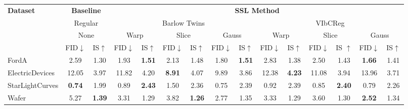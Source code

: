 \documentclass[../../thesis.tex]{subfiles}
\begin{document}
\begin{table}[H]
    \centering
    \begin{adjustbox}{width=\textwidth}
     \begin{tabular}{lcc|cc|cc|cc|cc|cc|cc} %
        \toprule
        \multirow{4}{*}{\textbf{Dataset}} & \multicolumn{2}{c}{\textbf{Baseline}} & \multicolumn{12}{c}{\textbf{SSL Method}} \\
                                            \cmidrule(lr){2-3} \cmidrule(lr){4-15}
                                          & \multicolumn{2}{c}{Regular}           & \multicolumn{6}{c}{Barlow Twins}                                                 &  \multicolumn{6}{c}{VIbCReg} \\
                                          \cmidrule(lr){2-3} \cmidrule(lr){4-9} \cmidrule(lr){10-15}
                                          &   \multicolumn{2}{c}{None}            & \multicolumn{2}{c}{Warp}  & \multicolumn{2}{c}{Slice} & \multicolumn{2}{c}{Gauss} & \multicolumn{2}{c}{Warp} & \multicolumn{2}{c}{Slice} & \multicolumn{2}{c}{Gauss} \\
                                          \cmidrule(lr){2-3} \cmidrule(lr){4-5} \cmidrule(lr){6-7} \cmidrule(lr){8-9} \cmidrule(lr){10-11} \cmidrule(lr){12-13}\cmidrule(lr){14-15}
                                          & FID$\downarrow$ & IS$\uparrow $                             & FID$\downarrow$ & IS$\uparrow$                  & FID$\downarrow$ & IS$\uparrow$                & FID$\downarrow$ & IS$\uparrow$                 & FID$\downarrow$ & IS$\uparrow$                 & FID$\downarrow$ & IS $\uparrow$                 & FID$\downarrow$ & IS$\uparrow$   \\
        \midrule
        FordA                   & 2.59 & 1.30 & 1.93 & \textbf{1.51} & 2.13 & 1.48 & 1.80 & \textbf{1.51} & 2.83 & 1.38 & 2.50 & 1.43 & \textbf{1.66} & 1.41 \\
        ElectricDevices         & 12.05 & 3.97 & 11.82 & 4.20 & \textbf{8.91} & 4.07 & 9.89 & 3.86 & 12.38 & \textbf{4.23} & 11.08 & 3.94 & 13.96 & 3.71 \\
        StarLightCurves         & \textbf{0.74} & 1.99 & 0.89 & \textbf{2.43} & 1.50 & 2.36 & 0.75 & 2.39 & 0.92 & 2.39 & 0.85 & \textbf{2.40} & 0.79 & 2.26 \\
        Wafer                   & 5.27 & \textbf{1.39} & 3.31 & 1.29 & 3.82 & \textbf{1.26} & 2.77 & 1.35 & 3.33 & 1.29 & 3.60 & 1.30 & \textbf{2.52} & 1.34 \\

\end{tabular}
\end{adjustbox}
\end{table}
\end{document}

